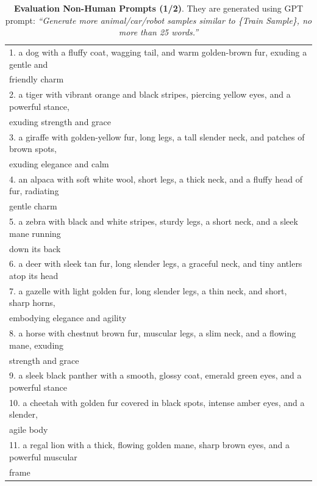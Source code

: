 \begin{table}[!ht]

\caption{\textbf{Evaluation Non-Human Prompts (1/2)}. They are generated using GPT prompt: \textit{``Generate more animal/car/robot samples similar to \{Train Sample\}, no more than 25 words.''}}
\label{tab:nonhuman_prompts_1}

\begin{threeparttable}
\resizebox{.99\textwidth}{!} 
{
\begin{tabular}{l}
\toprule
1. a dog with a fluffy coat, wagging tail, and warm golden-brown fur, exuding a gentle and \\ \quad friendly charm \\
2. a tiger with vibrant orange and black stripes, piercing yellow eyes, and a powerful stance, \\ \quad exuding strength and grace \\
3. a giraffe with golden-yellow fur, long legs, a tall slender neck, and patches of brown spots, \\ \quad exuding elegance and calm \\
4. an alpaca with soft white wool, short legs, a thick neck, and a fluffy head of fur, radiating \\ \quad gentle charm \\
5. a zebra with black and white stripes, sturdy legs, a short neck, and a sleek mane running \\ \quad down its back \\
6. a deer with sleek tan fur, long slender legs, a graceful neck, and tiny antlers atop its head \\
7. a gazelle with light golden fur, long slender legs, a thin neck, and short, sharp horns, \\ \quad embodying elegance and agility \\
8. a horse with chestnut brown fur, muscular legs, a slim neck, and a flowing mane, exuding \\ \quad strength and grace \\
9. a sleek black panther with a smooth, glossy coat, emerald green eyes, and a powerful stance \\
10. a cheetah with golden fur covered in black spots, intense amber eyes, and a slender, \\ \quad agile body \\
11. a regal lion with a thick, flowing golden mane, sharp brown eyes, and a powerful muscular \\ \quad frame \\

\end{tabular}}
\end{threeparttable}
\end{table}
